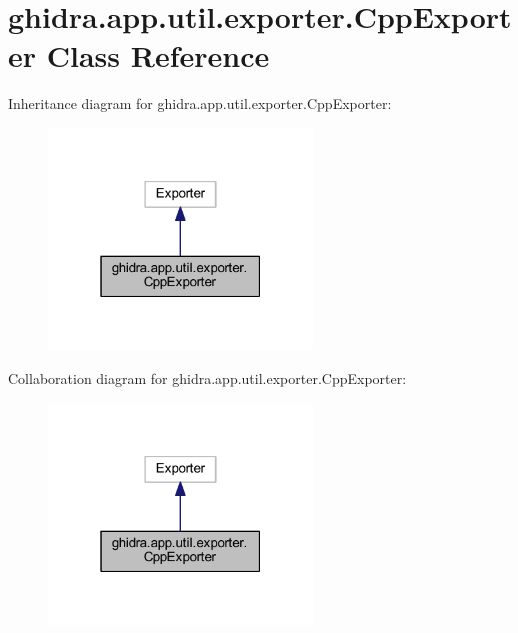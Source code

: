 \hypertarget{classghidra_1_1app_1_1util_1_1exporter_1_1_cpp_exporter}{}\section{ghidra.\+app.\+util.\+exporter.\+Cpp\+Exporter Class Reference}
\label{classghidra_1_1app_1_1util_1_1exporter_1_1_cpp_exporter}


Inheritance diagram for ghidra.\+app.\+util.\+exporter.\+Cpp\+Exporter\+:
\nopagebreak
\begin{figure}[H]
\begin{center}
\leavevmode
\includegraphics[width=199pt]{classghidra_1_1app_1_1util_1_1exporter_1_1_cpp_exporter__inherit__graph}
\end{center}
\end{figure}


Collaboration diagram for ghidra.\+app.\+util.\+exporter.\+Cpp\+Exporter\+:
\nopagebreak
\begin{figure}[H]
\begin{center}
\leavevmode
\includegraphics[width=199pt]{classghidra_1_1app_1_1util_1_1exporter_1_1_cpp_exporter__coll__graph}
\end{center}
\end{figure}
